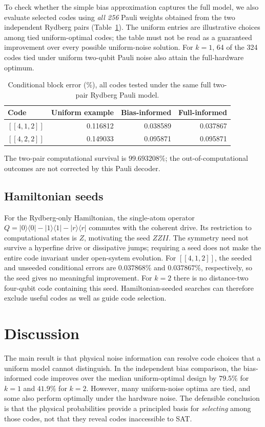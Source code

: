 To check whether the simple bias approximation captures the full model,
we also evaluate selected codes using \emph{all 256} Pauli weights obtained
from the two independent Rydberg pairs (Table~\ref{tab:res_full}).
The uniform entries are illustrative choices among tied uniform-optimal
codes; the table must not be read as a guaranteed improvement over every
possible uniform-noise solution. For $k=1$, 64 of the 324 codes tied under
uniform two-qubit Pauli noise also attain the full-hardware optimum.

\begin{table}[t]
\caption{Conditional block error (\%), all codes tested under the
same full two-pair Rydberg Pauli model.}
\label{tab:res_full}
\begin{ruledtabular}
\begin{tabular}{lrrr}
Code & Uniform example & Bias-informed & Full-informed\\
\hline
$[[4,1,2]]$ & 0.116812 & 0.038589 & 0.037867\\
$[[4,2,2]]$ & 0.149033 & 0.095871 & 0.095871\\
\end{tabular}
\end{ruledtabular}
\end{table}
The two-pair computational survival is $99.693208\%$; the
out-of-computational outcomes are not corrected by this Pauli decoder.

\subsection{Hamiltonian seeds}
For the Rydberg-only Hamiltonian, the single-atom operator
$Q=|0\rangle\langle0|-|1\rangle\langle1|-|r\rangle\langle r|$
commutes with the coherent drive. Its restriction to computational
states is $Z$, motivating the seed $ZZII$.
The symmetry need not survive a hyperfine drive or dissipative jumps;
requiring a seed does not make the entire code invariant under open-system
evolution. For $[[4,1,2]]$, the seeded and unseeded conditional errors
are $0.037868\%$ and $0.037867\%$, respectively, so the seed gives no
meaningful improvement. For $k=2$ there is no distance-two four-qubit
code containing this seed. Hamiltonian-seeded searches can therefore
exclude useful codes as well as guide code selection.

\section{Discussion}
\label{sec:discussion}
The main result is that physical noise information can resolve code
choices that a uniform model cannot distinguish. In the independent
bias comparison, the bias-informed code improves over the median
uniform-optimal design by $79.5\%$ for $k=1$ and $41.9\%$ for $k=2$.
However, many uniform-noise optima are tied, and some also perform
optimally under the hardware noise. The defensible conclusion is that
the physical probabilities provide a principled basis for \emph{selecting}
among those codes, not that they reveal codes inaccessible to SAT.

